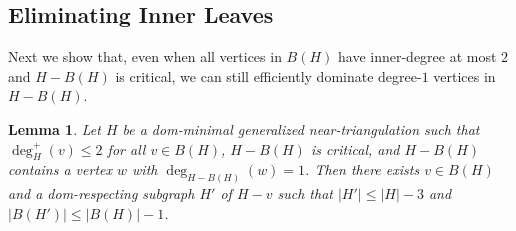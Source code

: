 \documentclass[a4paper,UKenglish,cleveref, autoref, thm-restate]{lipics-v2021}
\newtheorem{lem}{Lemma}
\newtheorem{cor}{Corollary}
\begin{document}
%
%


\subsection{Eliminating Inner Leaves}
\label{one_kill_sec}

Next we show that, even when all vertices in $B(H)$ have inner-degree at most $2$ and $H-B(H)$ is critical, we can still efficiently dominate degree-$1$ vertices in $H-B(H)$.


\begin{lem}\label{leaf_killer}
  Let $H$ be a dom-minimal generalized near-triangulation such that $\deg^+_H(v)\le 2$ for all $v\in B(H)$, $H-B(H)$ is critical, and $H-B(H)$ contains a vertex $w$ with $\deg_{H-B(H)}(w)=1$.  Then there exists $v\in B(H)$ and a dom-respecting subgraph $H'$ of $H-v$ such that $|H'|\le |H|-3$ and $|B(H')|\le |B(H)|-1$.
\end{lem}
\end{document}

